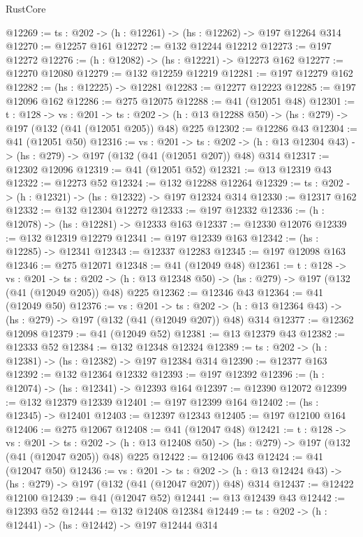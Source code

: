 \begin{lexlean}{RustCore}
\begin{coremodule}
@12269 := {ts : @202} -> (h : @12261) -> (hs : @12262) -> @197 @12264 @314
@12270 := @12257 @161
@12272 := @132 @12244 @12212
@12273 := @197 @12272
@12276 := (h : @12082) -> (hs : @12221) -> @12273 @162
@12277 := @12270 @12080
@12279 := @132 @12259 @12219
@12281 := @197 @12279 @162
@12282 := (hs : @12225) -> @12281
@12283 := @12277 @12223
@12285 := @197 @12096 @162
@12286 := @275 @12075
@12288 := @41 (@12051 @48)
@12301 := {t : @128} ->
  {vs : @201} ->
  {ts : @202} -> (h : @13 @12288 @50) -> (hs : @279) -> @197 (@132 (@41 (@12051 @205)) @48) @225
@12302 := @12286 @43
@12304 := @41 (@12051 @50)
@12316 := {vs : @201} ->
  {ts : @202} -> (h : @13 @12304 @43) -> (hs : @279) -> @197 (@132 (@41 (@12051 @207)) @48) @314
@12317 := @12302 @12096
@12319 := @41 (@12051 @52)
@12321 := @13 @12319 @43
@12322 := @12273 @52
@12324 := @132 @12288 @12264
@12329 := {ts : @202} -> (h : @12321) -> (hs : @12322) -> @197 @12324 @314
@12330 := @12317 @162
@12332 := @132 @12304 @12272
@12333 := @197 @12332
@12336 := (h : @12078) -> (hs : @12281) -> @12333 @163
@12337 := @12330 @12076
@12339 := @132 @12319 @12279
@12341 := @197 @12339 @163
@12342 := (hs : @12285) -> @12341
@12343 := @12337 @12283
@12345 := @197 @12098 @163
@12346 := @275 @12071
@12348 := @41 (@12049 @48)
@12361 := {t : @128} ->
  {vs : @201} ->
  {ts : @202} -> (h : @13 @12348 @50) -> (hs : @279) -> @197 (@132 (@41 (@12049 @205)) @48) @225
@12362 := @12346 @43
@12364 := @41 (@12049 @50)
@12376 := {vs : @201} ->
  {ts : @202} -> (h : @13 @12364 @43) -> (hs : @279) -> @197 (@132 (@41 (@12049 @207)) @48) @314
@12377 := @12362 @12098
@12379 := @41 (@12049 @52)
@12381 := @13 @12379 @43
@12382 := @12333 @52
@12384 := @132 @12348 @12324
@12389 := {ts : @202} -> (h : @12381) -> (hs : @12382) -> @197 @12384 @314
@12390 := @12377 @163
@12392 := @132 @12364 @12332
@12393 := @197 @12392
@12396 := (h : @12074) -> (hs : @12341) -> @12393 @164
@12397 := @12390 @12072
@12399 := @132 @12379 @12339
@12401 := @197 @12399 @164
@12402 := (hs : @12345) -> @12401
@12403 := @12397 @12343
@12405 := @197 @12100 @164
@12406 := @275 @12067
@12408 := @41 (@12047 @48)
@12421 := {t : @128} ->
  {vs : @201} ->
  {ts : @202} -> (h : @13 @12408 @50) -> (hs : @279) -> @197 (@132 (@41 (@12047 @205)) @48) @225
@12422 := @12406 @43
@12424 := @41 (@12047 @50)
@12436 := {vs : @201} ->
  {ts : @202} -> (h : @13 @12424 @43) -> (hs : @279) -> @197 (@132 (@41 (@12047 @207)) @48) @314
@12437 := @12422 @12100
@12439 := @41 (@12047 @52)
@12441 := @13 @12439 @43
@12442 := @12393 @52
@12444 := @132 @12408 @12384
@12449 := {ts : @202} -> (h : @12441) -> (hs : @12442) -> @197 @12444 @314

\end{coremodule}
\end{lexlean}
